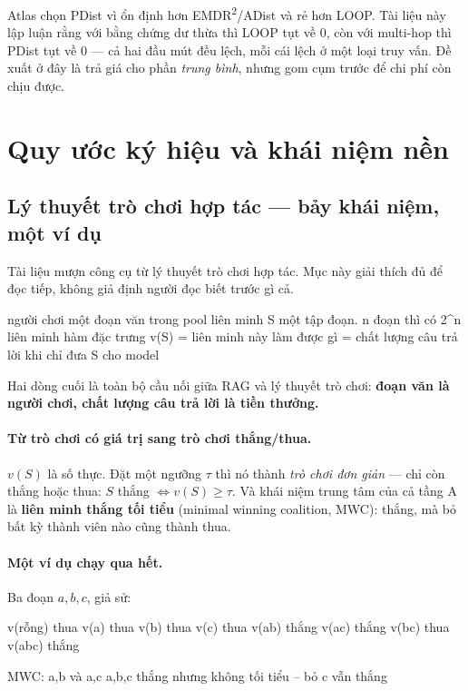 \documentclass[11pt,a4paper]{article}
\begin{document}
Atlas chọn PDist vì ổn định hơn EMDR\textsuperscript{2}/ADist và rẻ hơn LOOP. Tài liệu này
lập luận rằng với bằng chứng dư thừa thì LOOP tụt về 0, còn với multi-hop
thì PDist tụt về 0 --- cả hai đầu mút đều lệch, mỗi cái lệch ở một loại truy vấn. Đề xuất ở
đây là trả giá cho phần \emph{trung bình}, nhưng gom cụm trước để chi phí còn chịu được.

\section{Quy ước ký hiệu và khái niệm nền}

\subsection{Lý thuyết trò chơi hợp tác --- bảy khái niệm, một ví dụ}

Tài liệu mượn công cụ từ lý thuyết trò chơi hợp tác. Mục này giải thích đủ để đọc tiếp,
không giả định người đọc biết trước gì cả.

\begin{dia}
người chơi      một đoạn văn trong pool
liên minh S     một tập đoạn.  n đoạn thì có 2^n liên minh
hàm đặc trưng   v(S) = liên minh này làm được gì
                     = chất lượng câu trả lời khi chỉ đưa S cho model
\end{dia}

Hai dòng cuối là toàn bộ cầu nối giữa RAG và lý thuyết trò chơi: \textbf{đoạn văn là người
chơi, chất lượng câu trả lời là tiền thưởng.}

\paragraph{Từ trò chơi có giá trị sang trò chơi thắng/thua.} $v(S)$ là số thực. Đặt một
ngưỡng $\tau$ thì nó thành \emph{trò chơi đơn giản} --- chỉ còn thắng hoặc thua: $S$ thắng
$\iff v(S)\ge\tau$. Và khái niệm trung tâm của cả tầng A là \textbf{liên minh thắng tối
tiểu} (minimal winning coalition, MWC): thắng, mà bỏ bất kỳ thành viên nào cũng thành thua.

\paragraph{Một ví dụ chạy qua hết.} Ba đoạn $a,b,c$, giả sử:

\begin{dia}
v(rỗng) thua    v(a)  thua     v(b)  thua     v(c)   thua
v(ab) thắng     v(ac) thắng    v(bc) thua     v(abc) thắng

MWC:   { a,b }  và  { a,c }
       {a,b,c} thắng nhưng không tối tiểu -- bỏ c vẫn thắng
\end{dia}
\end{document}
